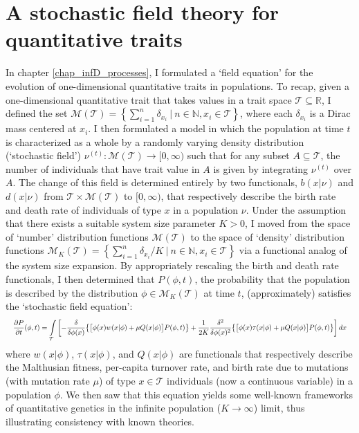 \section{A stochastic field theory for quantitative traits}\label{sec_disc_field_eqns}

In chapter \ref{chap_infD_processes}, I formulated a `field equation' for the evolution of one-dimensional quantitative traits in populations. To recap, given a one-dimensional quantitative trait that takes values in a trait space $\mathcal{T} \subseteq \mathbb{R}$, I defined the set $\mathcal{M}(\mathcal{T}) =  \left\{\sum_{i=1}^{n}\delta_{x_i} \ | \ n \in \mathbb{N}, x_i \in \mathcal{T}\right\}$, where each $\delta_{x_i}$ is a Dirac mass centered at $x_i$. I then formulated a model in which the population at time $t$ is characterized as a whole by a randomly varying density distribution (`stochastic field') $\nu^{(t)}: \mathcal{M}(\mathcal{T}) \to [0,\infty)$ such that for any subset $A \subseteq \mathcal{T}$, the number of individuals that have trait value in $A$ is given by integrating $\nu^{(t)}$ over $A$. The change of this field is determined entirely by two functionals, $b(x|\nu)$ and $d(x|\nu)$ from $\mathcal{T} \times \mathcal{M}(\mathcal{T})$ to $[0,\infty)$, that respectively describe the birth rate and death rate of individuals of type $x$ in a population $\nu$. Under the assumption that there exists a suitable system size parameter $K > 0$, I moved from the space of `number' distribution functions $\mathcal{M}(
\mathcal{T})$ to the space of `density' distribution functions $\mathcal{M}_{K}(\mathcal{T}) =  \left\{\sum_{i=1}^{n}\delta_{x_i}/K \ | \ n \in \mathbb{N}, x_i \in \mathcal{T}\right\}$ via a functional analog of the system size expansion. By appropriately rescaling the birth and death rate functionals, I then determined that $P(\phi,t)$, the probability that the population is described by the distribution $\phi \in \mathcal{M}_{K}(\mathcal{T})$ at time $t$, (approximately) satisfies the `stochastic field equation':
\begin{equation}
\label{disc_functional_field_eqns}
\resizebox{\textwidth}{!}{$\displaystyle
\frac{\partial P}{\partial t}(\phi,t) = \int\limits_{\mathcal{T}}\left[-
\frac{\delta}{\delta\phi(x)} \big{\{} \big{[}\phi(x) w(x|\phi) + \mu Q(x|\phi)\big{]} P(\phi,t) \big{\}} + \frac{1}{2K}\frac{\delta^2}{\delta\phi(x)^2}\big{\{}\big{[}\phi(x) \tau(x|\phi) + \mu Q(x|\phi)\big{]}P(\phi,t)\big{\}}\right]dx$}
\end{equation}
where $w(x|\phi)$, $\tau(x|\phi)$, and $Q(x|\phi)$ are functionals that respectively describe the Malthusian fitness, per-capita turnover rate, and birth rate due to mutations (with mutation rate $\mu$) of type $x \in \mathcal{T}$ individuals (now a continuous variable) in a population $\phi$. We then saw that this equation yields some well-known frameworks of quantitative genetics in the infinite population ($K \to \infty$) limit, thus illustrating consistency with known theories.

